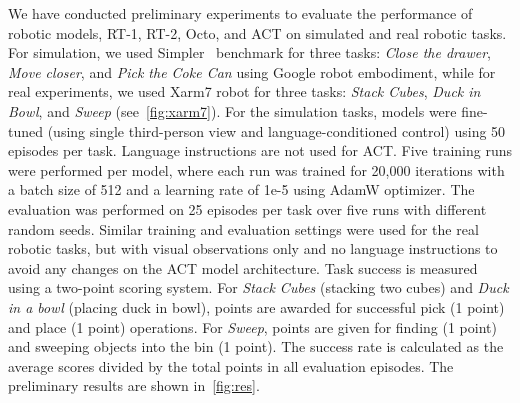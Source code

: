 We have conducted preliminary experiments to evaluate the performance of robotic models, \ie RT-1, RT-2, Octo, and ACT on simulated and real robotic tasks. 
For simulation, we used Simpler~\cite{li24simpler} benchmark for three tasks: \emph{Close the drawer}, \emph{Move closer}, and \emph{Pick the Coke Can} using Google robot embodiment, while for real experiments, we used Xarm7 robot for three tasks: \emph{Stack Cubes}, \emph{Duck in Bowl}, and \emph{Sweep} (see~\autoref{fig:xarm7}).
For the simulation tasks, models were fine-tuned (using single third-person view and language-conditioned control) using 50 episodes per task. Language instructions are not used for ACT. Five training runs were performed per model, where each run was trained for 20,000 iterations with a batch size of 512 and a learning rate of 1e-5 using AdamW optimizer. The evaluation was performed on 25 episodes per task over five runs with different random seeds.
Similar training and evaluation settings were used for the real robotic tasks, but with visual observations only and no language instructions to avoid any changes on the ACT model architecture. 
Task success is measured using a two-point scoring system. For \emph{Stack Cubes} (stacking two cubes) and \emph{Duck in a bowl} (placing duck in bowl), points are awarded for successful pick (1 point) and place (1 point) operations. For \emph{Sweep}, points are given for finding (1 point) and sweeping objects into the bin (1 point). The success rate is calculated as the average scores divided by the total points in all evaluation episodes.
The preliminary results are shown in~\autoref{fig:res}.





